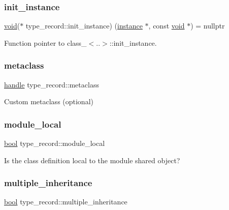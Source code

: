 \subsubsection{\texorpdfstring{init\_instance}{init\_instance}}
{\footnotesize\ttfamily \mbox{\hyperlink{_s_d_l__opengles2__gl2ext_8h_ae5d8fa23ad07c48bb609509eae494c95}{void}}($\ast$ type\+\_\+record\+::init\+\_\+instance) (\mbox{\hyperlink{structinstance}{instance}} $\ast$, const \mbox{\hyperlink{_s_d_l__opengles2__gl2ext_8h_ae5d8fa23ad07c48bb609509eae494c95}{void}} $\ast$) = nullptr}



Function pointer to class\+\_\+$<$..$>$\+::init\+\_\+instance. 

\mbox{\label{structtype__record_a07699840bb125ef8d7d17122975c4d17}} 
\subsubsection{\texorpdfstring{metaclass}{metaclass}}
{\footnotesize\ttfamily \mbox{\hyperlink{classhandle}{handle}} type\+\_\+record\+::metaclass}



Custom metaclass (optional) 

\mbox{\label{structtype__record_a6a5eaf1332f8278dc0f41643fd6783a7}} 
\subsubsection{\texorpdfstring{module\_local}{module\_local}}
{\footnotesize\ttfamily \mbox{\hyperlink{asdl_8h_af6a258d8f3ee5206d682d799316314b1}{bool}} type\+\_\+record\+::module\+\_\+local}



Is the class definition local to the module shared object? 

\mbox{\label{structtype__record_a13c1d8df682426b1de648c1231979231}} 
\subsubsection{\texorpdfstring{multiple\_inheritance}{multiple\_inheritance}}
{\footnotesize\ttfamily \mbox{\hyperlink{asdl_8h_af6a258d8f3ee5206d682d799316314b1}{bool}} type\+\_\+record\+::multiple\+\_\+inheritance}



